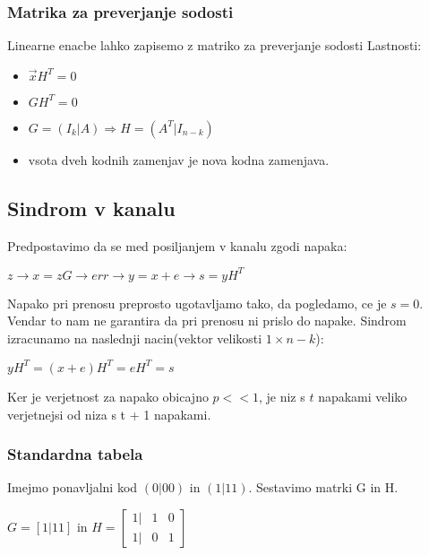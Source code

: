 \documentclass{article}
\begin{document}
\begin{multicols}{4}
	\subsubsection{Matrika za preverjanje sodosti}
	Linearne enacbe lahko zapisemo z matriko za preverjanje sodosti
	Lastnosti:
	\begin{itemize}
		\item $\vec{x}H^T = 0$
		\item $GH^T = 0$
		\item $G = (I_k | A) \Rightarrow H = (A^T | I_{n-k})$
		\item vsota dveh kodnih zamenjav je nova kodna zamenjava.
	\end{itemize}

	\subsection{Sindrom v kanalu}
	Predpostavimo da se med posiljanjem v kanalu zgodi napaka:
	\begin{center}
		\begin{math}
			z \rightarrow x = zG \rightarrow err\rightarrow y = x + e \rightarrow s = yH^T
		\end{math}
	\end{center}
	Napako pri prenosu preprosto ugotavljamo tako, da pogledamo, ce je $s = 0$. Vendar to nam ne garantira da pri prenosu ni prislo do napake.
	Sindrom izracunamo na naslednji nacin(vektor velikosti $1 \times n - k$):
	\begin{center}
		\begin{math}
			yH^T = (x + e)H^T = eH^T = s
		\end{math}
	\end{center}
	Ker je verjetnost za napako obicajno $p << 1$, je niz s $t$ napakami veliko
	verjetnejsi od niza s t + 1 napakami.

	\subsubsection{Standardna tabela}
	Imejmo ponavljalni kod $(0|00)$ in $(1|11)$. Sestavimo matrki G in H.

	\begin{math}
		G = [1|11] \text{ in } H =
		\begin{bmatrix}
			1 | & 1 & 0 \\
			1 | & 0 & 1
		\end{bmatrix}
	\end{math}



\end{multicols}
\end{document}
